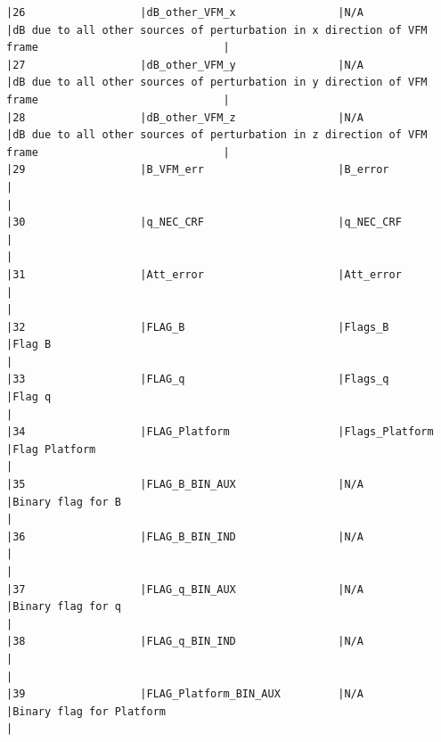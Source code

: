 \begin{verbatim}
|26                  |dB_other_VFM_x                |N/A                           |dB due to all other sources of perturbation in x direction of VFM frame                             |
|27                  |dB_other_VFM_y                |N/A                           |dB due to all other sources of perturbation in y direction of VFM frame                             |
|28                  |dB_other_VFM_z                |N/A                           |dB due to all other sources of perturbation in z direction of VFM frame                             |
|29                  |B_VFM_err                     |B_error                       |                                                                                                    |
|30                  |q_NEC_CRF                     |q_NEC_CRF                     |                                                                                                    |
|31                  |Att_error                     |Att_error                     |                                                                                                    |
|32                  |FLAG_B                        |Flags_B                       |Flag B                                                                                              |
|33                  |FLAG_q                        |Flags_q                       |Flag q                                                                                              |
|34                  |FLAG_Platform                 |Flags_Platform                |Flag Platform                                                                                       |
|35                  |FLAG_B_BIN_AUX                |N/A                           |Binary flag for B                                                                                   |
|36                  |FLAG_B_BIN_IND                |N/A                           |                                                                                                    |
|37                  |FLAG_q_BIN_AUX                |N/A                           |Binary flag for q                                                                                   |
|38                  |FLAG_q_BIN_IND                |N/A                           |                                                                                                    |
|39                  |FLAG_Platform_BIN_AUX         |N/A                           |Binary flag for Platform                                                                            |

\end{verbatim}
